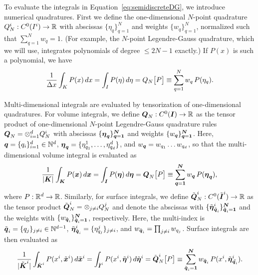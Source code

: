 \documentclass[10pt,preprint]{aastex}
\begin{document}
To evaluate the integrals in Equation~\eqref{eq:semidiscreteDG}, we introduce numerical quadratures.  
First we define the one-dimensional $N$-point quadrature $Q_{N}^{i}:C^{0}(I^{i})\to\mathbb{R}$ with abscissas $\{\eta_{q}\}_{q=1}^{N}$ and weights $\{w_{q}\}_{q=1}^{N}$, normalized such that $\sum_{q=1}^{N}w_{q}=1$.  
(For example, the $N$-point Legendre-Gauss quadrature, which we will use, integrates polynomials of degree $\le 2N-1$ exactly.)
If $P(x)$ is such a polynomial, we have
\begin{equation}
  \frac{1}{\Delta x}\int_{K}P(x)\,dx=\int_{I}P(\eta)\,d\eta=Q_{N}\big[P\big]\equiv\sum_{q=1}^{N}w_{q}\,P(\eta_{q}).  
\end{equation}

Multi-dimensional integrals are evaluated by tensorization of one-dimensional quadratures.  
For volume integrals, we define $\boldsymbol{Q}_{N}:C^{0}(\boldsymbol{I})\to\mathbb{R}$ as the tensor product of one-dimensional $N$-point Legendre-Gauss quadrature rules $\boldsymbol{Q}_{N}=\otimes_{i=1}^{d}Q_{N}^{i}$ with abscissas $\{\boldsymbol{\eta}_{\boldsymbol{q}}\}_{\boldsymbol{q}=\boldsymbol{1}}^{\boldsymbol{N}}$ and weights $\{w_{\boldsymbol{q}}\}_{\boldsymbol{q}=\boldsymbol{1}}^{\boldsymbol{N}}$.  
Here, $\boldsymbol{q}=\{q_{i}\}_{i=1}^{d}\in\mathbb{N}^{d}$, $\boldsymbol{\eta}_{\boldsymbol{q}}=\{\eta_{q_{1}}^{1},\ldots,\eta_{q_{d}}^{d}\}$, and $w_{\boldsymbol{q}}=w_{q_{1}}\ldots w_{q_{d}}$, so that the multi-dimensional volume integral is evaluated as
\begin{equation}
  \frac{1}{|\boldsymbol{K}|}\int_{\boldsymbol{K}}P(\boldsymbol{x})\,d\boldsymbol{x}
  =\int_{\boldsymbol{I}}P(\boldsymbol{\eta})\,d\boldsymbol{\eta}
  =\boldsymbol{Q}_{N}\big[P\big]
  \equiv\sum_{\boldsymbol{q}=\boldsymbol{1}}^{\boldsymbol{N}}w_{\boldsymbol{q}}\,P(\boldsymbol{\eta}_{\boldsymbol{q}}),
\end{equation}
where $P:\mathbb{R}^{d}\to\mathbb{R}$.  
Similarly, for surface integrals, we define $\tilde{\boldsymbol{Q}}_{N}^{i}:C^{0}(\tilde{\boldsymbol{I}}^{i})\to\mathbb{R}$ as the tensor product $\tilde{\boldsymbol{Q}}_{N}^{i}=\otimes_{j\ne i}Q_{N}^{j}$ and denote the abscissas with $\{\tilde{\boldsymbol{\eta}}_{\tilde{\boldsymbol{q}}_{i}}^{i}\}_{\tilde{\boldsymbol{q}}_{i}=\boldsymbol{1}}^{\boldsymbol{N}}$ and the weights with $\{w_{\tilde{\boldsymbol{q}}_{i}}\}_{\tilde{\boldsymbol{q}}_{i}=\boldsymbol{1}}^{\boldsymbol{N}}$, respectively.  
Here, the multi-index is $\tilde{\boldsymbol{q}}_{i}=\{q_{j}\}_{j\ne i}\in\mathbb{N}^{d-1}$, $\tilde{\boldsymbol{\eta}}_{\tilde{\boldsymbol{q}}_{i}}^{i}=\{\eta_{q_{j}}^{j}\}_{j\ne i}$, and $w_{\tilde{\boldsymbol{q}}_{i}}=\prod_{j\ne i}w_{q_{j}}$.  
Surface integrals are then evaluated as
\begin{equation}
  \frac{1}{|\tilde{\boldsymbol{K}}^{i}|}\int_{\tilde{\boldsymbol{K}}^{i}}P(x^{i},\tilde{\boldsymbol{x}}^{i})\,d\tilde{\boldsymbol{x}}^{i}
  =\int_{\tilde{\boldsymbol{I}}^{i}}P(x^{i},\tilde{\boldsymbol{\eta}}^{i})\,d\tilde{\boldsymbol{\eta}}^{i}
  =\tilde{\boldsymbol{Q}}_{N}^{i}\big[P\big]
  \equiv\sum_{\tilde{\boldsymbol{q}}_{i}=\boldsymbol{1}}^{\boldsymbol{N}}w_{\tilde{\boldsymbol{q}}_{i}}\,P(x^{i},\tilde{\boldsymbol{\eta}}_{\tilde{\boldsymbol{q}_{i}}}^{i}).  
\end{equation}
\end{document}
